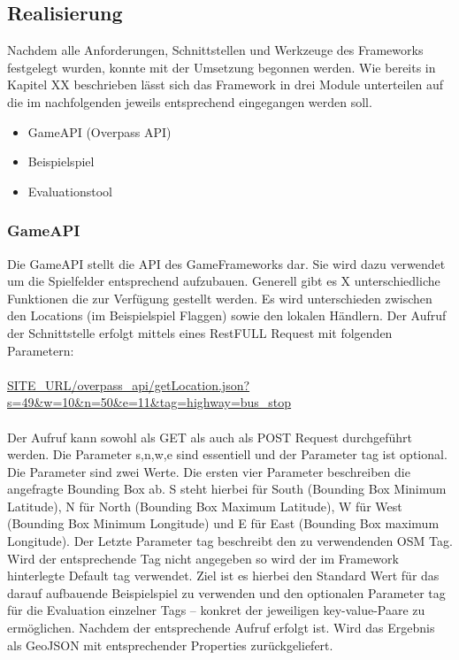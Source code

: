 \subsection*{Realisierung}

Nachdem alle Anforderungen, Schnittstellen und Werkzeuge des Frameworks festgelegt wurden, konnte mit der Umsetzung begonnen werden.
Wie bereits in Kapitel XX beschrieben lässt sich das Framework in drei Module unterteilen auf die im nachfolgenden jeweils entsprechend eingegangen werden soll.

\begin{itemize}

\item GameAPI (Overpass API)
\item Beispielspiel
\item Evaluationstool

\end{itemize}

\subsubsection*{GameAPI}

Die GameAPI stellt die API des GameFrameworks dar. Sie wird dazu verwendet um die Spielfelder entsprechend aufzubauen.
Generell gibt es X unterschiedliche Funktionen die zur Verfügung gestellt werden.
Es wird unterschieden zwischen den Locations (im Beispielspiel Flaggen) sowie den lokalen Händlern.
Der Aufruf der Schnittstelle erfolgt mittels eines RestFULL Request mit folgenden Parametern:
\\\\
\url{SITE\_URL/overpass\_api/getLocation.json?s=49&w=10&n=50&e=11&tag=highway=bus\_stop}
\\\\
Der Aufruf kann sowohl als GET als auch als POST Request durchgeführt werden. Die Parameter s,n,w,e sind essentiell und der Parameter tag ist optional.
Die Parameter sind zwei Werte. Die ersten vier Parameter beschreiben die angefragte Bounding Box ab. S steht hierbei für South (Bounding Box Minimum Latitude), N für North (Bounding Box Maximum Latitude), W für West (Bounding Box Minimum Longitude) und E für East (Bounding Box maximum Longitude). Der Letzte Parameter tag beschreibt den zu verwendenden OSM Tag. Wird der entsprechende Tag nicht angegeben so wird der im Framework hinterlegte Default tag verwendet. Ziel ist es hierbei den Standard Wert für das darauf aufbauende Beispielspiel zu verwenden und den optionalen Parameter tag für die Evaluation einzelner Tags -- konkret der jeweiligen key-value-Paare zu ermöglichen. Nachdem der entsprechende Aufruf erfolgt ist. Wird das Ergebnis als GeoJSON mit entsprechender Properties zurückgeliefert.
\\\\ %

